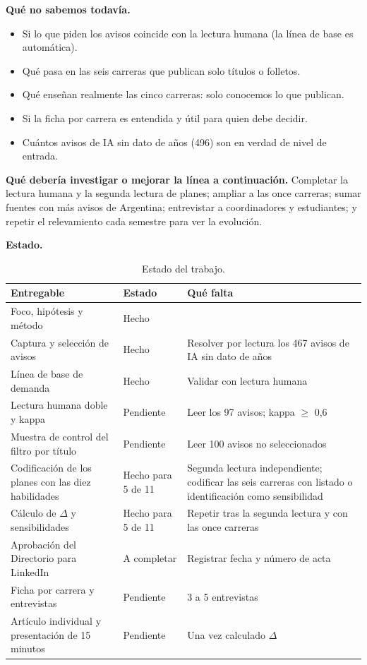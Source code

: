 \documentclass[11pt,a4paper]{article}
\begin{document}
\textbf{Qué no sabemos todavía.}
\begin{itemize}
\item Si lo que piden los avisos coincide con la lectura humana (la línea de base es automática).
\item Qué pasa en las seis carreras que publican solo títulos o folletos.
\item Qué enseñan realmente las cinco carreras: solo conocemos lo que publican.
\item Si la ficha por carrera es entendida y útil para quien debe decidir.
\item Cuántos avisos de IA sin dato de años (496) son en verdad de nivel de entrada.
\end{itemize}

\textbf{Qué debería investigar o mejorar la línea a continuación.} Completar la lectura humana y la segunda lectura de planes; ampliar a las once carreras; sumar fuentes con más avisos de Argentina; entrevistar a coordinadores y estudiantes; y repetir el relevamiento cada semestre para ver la evolución.

\textbf{Estado.}
\begin{table}[H]
\centering\small
\begin{tabularx}{\textwidth}{L{6.2cm} L{2.6cm} X}
\toprule
{}\textbf{Entregable} & \textbf{Estado} & \textbf{Qué falta}\\
\midrule
Foco, hipótesis y método & Hecho & \\
Captura y selección de avisos & Hecho & Resolver por lectura los 467 avisos de IA sin dato de años\\
Línea de base de demanda & Hecho & Validar con lectura humana\\
Lectura humana doble y kappa & Pendiente & Leer los 97 avisos; kappa $\geq$ 0,6\\
Muestra de control del filtro por título & Pendiente & Leer 100 avisos no seleccionados\\
Codificación de los planes con las diez habilidades & Hecho para 5 de 11 & Segunda lectura independiente; codificar las seis carreras con listado o identificación como sensibilidad\\
Cálculo de $\Delta$ y sensibilidades & Hecho para 5 de 11 & Repetir tras la segunda lectura y con las once carreras\\
Aprobación del Directorio para LinkedIn & A completar & Registrar fecha y número de acta\\
Ficha por carrera y entrevistas & Pendiente & 3 a 5 entrevistas\\
Artículo individual y presentación de 15 minutos & Pendiente & Una vez calculado $\Delta$\\
\bottomrule
\end{tabularx}
\caption{Estado del trabajo.}
\end{table}
\end{document}
